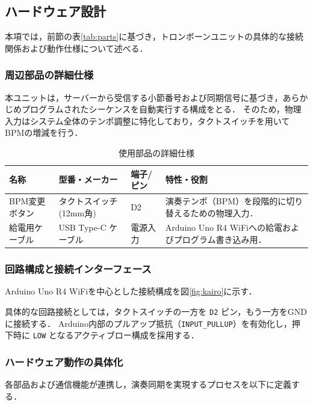 \documentclass[uplatex,dvipdfmx]{jsarticle}
\begin{document}
\subsection{\textbf{ハードウェア設計}}
本項では，前節の表\ref{tab:parts}に基づき，トロンボーンユニットの具体的な接続関係および動作仕様について述べる．

\subsubsection{周辺部品の詳細仕様}
本ユニットは，サーバーから受信する小節番号および同期信号に基づき，あらかじめプログラムされたシーケンスを自動実行する構成をとる．
そのため，物理入力はシステム全体のテンポ調整に特化しており，タクトスイッチを用いてBPMの増減を行う．

\begin{table}[H]
\centering
\caption{使用部品の詳細仕様}
\label{tab:hardware_spec_final}
\renewcommand{\arraystretch}{1.2}
\small
\begin{tabularx}{\textwidth}{|l|l|l|X|}
\hline
\textbf{名称} & \textbf{型番・メーカー} & \textbf{端子/ピン} & \textbf{特性・役割} \\ \hline
BPM変更ボタン & タクトスイッチ (12mm角) & D2 & 演奏テンポ（BPM）を段階的に切り替えるための物理入力． \\ \hline
給電用ケーブル & USB Type-C ケーブル & 電源入力 & Arduino Uno R4 WiFiへの給電およびプログラム書き込み用． \\ \hline
\end{tabularx}
\end{table}

\subsubsection{回路構成と接続インターフェース}
Arduino Uno R4 WiFiを中心とした接続構成を図\ref{fig:kairo}に示す．


具体的な回路接続としては，タクトスイッチの一方を \texttt{D2} ピン，もう一方をGNDに接続する．
Arduino内部のプルアップ抵抗（\texttt{INPUT\_PULLUP}）を有効化し，押下時に \texttt{LOW} となるアクティブロー構成を採用する．

\subsubsection{ハードウェア動作の具体化}
各部品および通信機能が連携し，演奏同期を実現するプロセスを以下に定義する．
\end{document}
